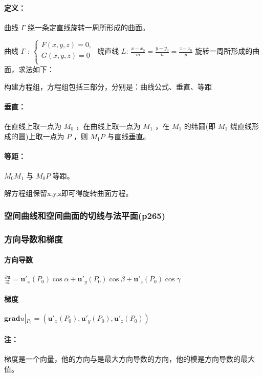 ﻿\documentclass[a4paper,12pt,UTF8]{ctexart}
\begin{document}
    \paragraph{定义：} 曲线 \(\varGamma\) 绕一条定直线旋转一周所形成的曲面。
    
    曲线 \(\varGamma\) : 
    \(\begin{cases}
        F(x,y,z)=0,\\
        G(x,y,z)=0\\
    \end{cases} \)
    绕直线 \(L\): \(\frac{x-x_0}{m}=\frac{y-y_0}{n}=\frac{z-z_0}{p}\) 旋转一周所形成的曲面，求法如下：

    构建方程组，方程组包括三部分，分别是：曲线公式、垂直、等距

    \paragraph{垂直：} 在直线上取一点为 \(M_0\) ，在曲线上取一点为 \(M_1\) ，在 \(M_1\) 的纬圆(即 \(M_1\) 绕直线形成的圆)上取一点为 \(P\) ，则 \(M_1P\) 与直线垂直。
    \paragraph{等距：} \(M_0M_1\) 与 \(M_0P\) 等距。

    解方程组保留x,y,z即可得旋转曲面方程。
    
    \subsubsection{空间曲线和空间曲面的切线与法平面(p265)}
    
    \subsubsection{方向导数和梯度}
    \paragraph{方向导数} \(\frac{\partial \mathbf{u}}{\partial \mathbf{l}}= \mathbf{u}'_x(P_0)\cos \alpha + \mathbf{u}'_y(P_0)\cos \beta + \mathbf{u}'_z(P_0)\cos \gamma\)
    \paragraph{梯度} \(\mathbf{grad} u \left|_{P_0}\right. = \left(\mathbf{u}'_x(P_0), \mathbf{u}'_y(P_0), \mathbf{u}'_z(P_0)\right)\)
    \paragraph{注：} 梯度是一个向量，他的方向与是最大方向导数的方向，他的模是方向导数的最大值。
        
\end{document}
